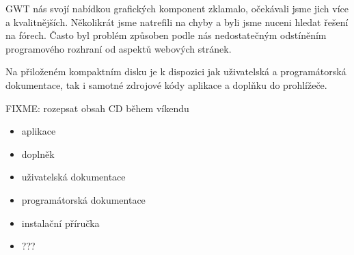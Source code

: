 GWT nás svojí nabídkou grafických komponent zklamalo, očekávali jsme jich více a kvalitnějších.
Několikrát jsme natrefili na chyby a byli jsme nuceni hledat řešení na fórech.
Často byl problém způsoben podle nás nedostatečným odstíněním programového rozhraní od aspektů webových stránek.


Na přiloženém kompaktním disku je k dispozici jak uživatelská a programátorská dokumentace, tak i samotné zdrojové kódy aplikace a doplňku do prohlížeče.

FIXME: rozepsat obsah CD během víkendu

\begin{itemize}
	\item aplikace
	\item doplněk
	\item uživatelská dokumentace
	\item programátorská dokumentace
	\item instalační příručka
	\item ???
\end{itemize}
